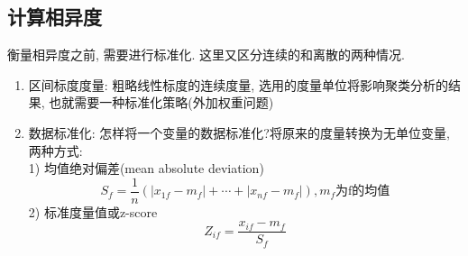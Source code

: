 \documentclass[a4paper,10pt,english]{article}
\begin{document}
\subsection{计算相异度}
衡量相异度之前, 需要进行标准化. 这里又区分连续的和离散的两种情况. \\
\begin{enumerate}
\item {区间标度度量:}
粗略线性标度的连续度量, 选用的度量单位将影响聚类分析的结果, 也就需要一种标准化策略(外加权重问题)
\item {数据标准化:}
怎样将一个变量的数据标准化?将原来的度量转换为无单位变量, 两种方式:\\
1) 均值绝对偏差(mean absolute deviation) $$ S_f = \frac{1}{n}(\lvert x_{1f} - m_f \rvert + \cdots + \lvert x_{nf} - m_f \rvert), m_f \mbox{为f的均值} $$
2) 标准度量值或z-score $$ Z_{if} = \frac{x_{if} - m_f}{S_f}$$
\end{enumerate}
\end{document}
